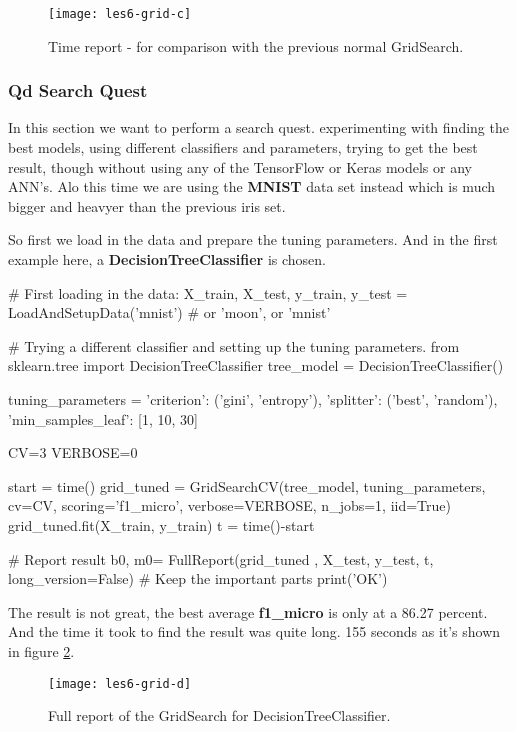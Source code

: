 \documentclass{article}
\begin{document}
\begin{figure}[H]
  \centering
    \texttt{[image: les6-grid-c]}
    \caption{Time report - for comparison with the previous normal GridSearch.}
    \label{fig:les6-grid-c}
\end{figure}

\subsubsection{Qd Search Quest}
In this section we want to perform a search quest. experimenting with finding the best models,
using different classifiers and parameters, trying to get the best result, though without using any of the TensorFlow or Keras models or any ANN's. Alo this time we are using the \textbf{MNIST} data set instead which is much bigger and heavyer than the previous iris set.

So first we load in the data and prepare the tuning parameters. And in the first example here,
a \textbf{DecisionTreeClassifier} is chosen.

\begin{pyminted}
# First loading in the data:
X_train, X_test, y_train, y_test = LoadAndSetupData('mnist') # or 'moon', or 'mnist'

# Trying a different classifier and setting up the tuning parameters.
from sklearn.tree import DecisionTreeClassifier
tree_model = DecisionTreeClassifier()

tuning_parameters = {
    'criterion': ('gini', 'entropy'),
    'splitter': ('best', 'random'),
    'min_samples_leaf': [1, 10, 30]
}

CV=3
VERBOSE=0

start = time()
grid_tuned = GridSearchCV(tree_model, tuning_parameters, cv=CV, scoring='f1_micro', verbose=VERBOSE, n_jobs=1, iid=True)
grid_tuned.fit(X_train, y_train)
t = time()-start

# Report result
b0, m0= FullReport(grid_tuned , X_test, y_test, t, long_version=False) # Keep the important parts
print('OK')
\end{pyminted}

\newpage
\noindent
The result is not great, the best average \textbf{f1\_micro} is only at a 86.27 percent. And the time it took to find the result was quite long.
155 seconds as it's shown in figure \ref{fig:les6-grid-d}.

\begin{figure}[H]
  \centering
    \texttt{[image: les6-grid-d]}
    \caption{Full report of the GridSearch for DecisionTreeClassifier.}
    \label{fig:les6-grid-d}
\end{figure}
\end{document}
